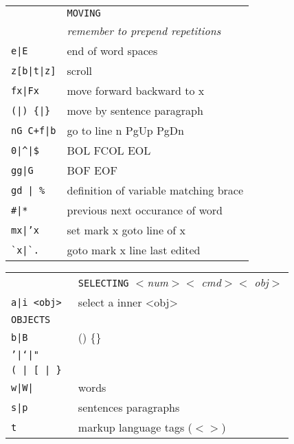 \begin{tabular}{ll}
&\texttt{MOVING}\\
&\emph{remember to prepend repetitions}\\
\texttt{e|E}& end of word \textbar{} spaces\\
\texttt{z[b|t|z]}& scroll\\
\texttt{fx|Fx}& move forward \textbar{} backward to x\\
\texttt{(|) \{|\}}& move by sentence \textbar{} paragraph\\
\texttt{nG C+f|b}& go to line n PgUp \textbar{} PgDn\\
\texttt{0|\^{}|\$}& BOL \textbar{} FCOL \textbar{}EOL\\
\texttt{gg|G}&BOF \textbar{} EOF\\
\texttt{gd | \%}& definition of variable \textbar{} matching brace\\
\texttt{\#|*}& previous \textbar{} next occurance of word\\
\texttt{mx|'x}&set mark x \textbar{} goto line of x\\
\texttt{\`{}x|\`{}.}&goto mark x \textbar{} line last edited\\
\end{tabular}

\vfill

\begin{tabular}{ll}
&\texttt{SELECTING} \emph{$<$num$><$ cmd$><$ obj$>$}\\
\texttt{a|i <obj>}& select a \textbar{} inner <obj>\\
\texttt{OBJECTS}&\\
\texttt{b|B}&() \textbar{} \{\} \\
\texttt{'|`|"}&\\
\texttt{( | [ | \} }&\\
\texttt{w|W|}&words\\
\texttt{s|p}&sentences \textbar{} paragraphs\\
\texttt{t}&markup language tags ($<>$) \\
\end{tabular}

\vfill

